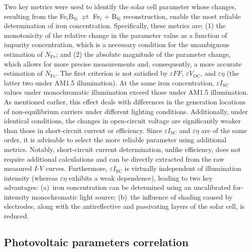 \documentclass[a4paper,fleqn]{cas-sc}
\begin{document}
Two key metrics were used to identify the solar cell parameter whose changes,
resulting from the Fe$_i$B$_\mathrm{Si}$ $\rightleftarrows$ Fe$_i$ + B$_\mathrm{Si}$ reconstruction,
enable the most reliable determination of iron concentration.
Specifically, these metrics are:
(1) the monotonicity of the relative change in the parameter value as a function of impurity concentration,
which is a necessary condition for the unambiguous estimation of $N_\mathrm{Fe}$;
and (2) the absolute magnitude of the parameter change, which allows for more precise measurements and,
consequently, a more accurate estimation of $N_\mathrm{Fe}$.
The first criterion is not satisfied by $\varepsilon F\!F$, $\varepsilon V_\mathrm{OC}$, and $\varepsilon \eta$
(the latter two under AM1.5 illumination).
At the same iron concentration, $\varepsilon I_\mathrm{SC}$ values under monochromatic illumination exceed those under AM1.5 illumination.
As mentioned earlier, this effect deals with differences in the generation locations
of non-equilibrium carriers under different lighting conditions.
Additionally, under identical conditions, the changes in open-circuit voltage are significantly weaker
than those in short-circuit current or efficiency.
Since $\varepsilon I_\mathrm{SC}$ and $\varepsilon \eta$ are of the same order,
it is advisable to select the more reliable parameter using additional metrics.
Notably, short-circuit current determination, unlike efficiency, does not require additional calculations
and can be directly extracted from the raw measured $I$-$V$ curves.
Furthermore, $\varepsilon I_\mathrm{SC}$ is virtually independent of illumination intensity
(whereas $\varepsilon \eta$ exhibits a weak dependence), leading to two key advantages:
(a)~iron concentration can be determined using an uncalibrated for-intensity monochromatic light source;
(b)~the influence of shading caused by electrodes, along with the antireflective and passivating layers of the solar cell, is reduced.

\subsection{Photovoltaic parameters correlation}
\end{document}
